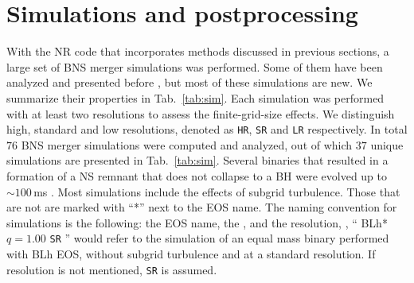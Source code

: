 \section{Simulations and postprocessing} \label{sec:nr_methods:sims}


With the \ac{NR} code \wisky{} that incorporates methods discussed in 
previous sections, a large set of \ac{BNS} merger simulations was performed.
Some of them have been analyzed and presented before \citep{Perego:2019adq}, 
but most of these simulations are new. 
%
We summarize their properties in Tab.~\ref{tab:sim}. 
%
%
Each simulation was performed with at least two resolutions to assess the 
finite-grid-size effects. We distinguish high, standard and low resolutions, 
denoted as \texttt{HR}, \texttt{SR} and \texttt{LR} respectively. 
%
In total $76$ \ac{BNS} merger simulations were computed and analyzed, 
out of which $37$ unique simulations are presented in Tab.~\ref{tab:sim}. 
%
%
%
Several binaries that resulted in a formation of a \ac{NS} remnant 
that does not collapse to a \ac{BH} were evolved up to ${\sim}100\,$ms \pmerg.
%
Most simulations include the effects of subgrid turbulence. 
Those that are not are marked with ``*'' next to the \ac{EOS} name.
%
The naming convention for simulations is the following: 
the \ac{EOS} name, the \mr{}, and the resolution, \eg, 
`` BLh* $q=1.00$ \texttt{SR} '' would refer to the simulation of an 
equal mass binary performed with BLh \ac{EOS}, without subgrid 
turbulence and at a standard resolution. 
If resolution is not mentioned, \texttt{SR} is assumed.

